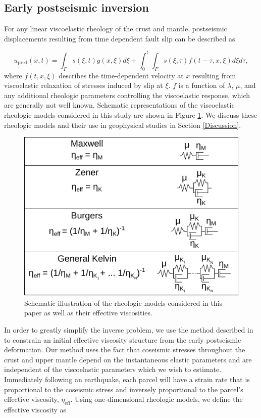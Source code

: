 \subsection{Early postseismic inversion}\label{ch3:sec:InitialInversion}
For any linear viscoelastic rheology of the crust and mantle, postseismic displacements resulting from time dependent fault slip can be described as  

\begin{equation}\label{GeneralForward}
  u_\mathrm{pred}(x,t) = \int_F s(\xi,t)g(x,\xi)d\xi + 
           \int_0^t\int_F s(\xi,\tau) f(t-\tau,x,\xi) d\xi d\tau,
\end{equation}
where $f(t,x,\xi)$ describes the time-dependent velocity at $x$ resulting from viscoelastic relaxation of stresses induced by slip at $\xi$. $f$ is a function of $\lambda$, $\mu$, and any additional rheologic parameters controlling the viscoelastic response, which are generally not well known. Schematic representations of the viscoelastic rheologic models considered in this study are shown in Figure \ref{ch3:fig:Rheology}.  We discuss these rheologic models and their use in geophysical studies in Section \ref{Discussion}. 

\begin{figure}
\includegraphics[scale=1.0]{ch3/figures/2016jb013114-f08}
\centering 
\caption{Schematic illustration of the rheologic models considered in this paper as well as their effective viscosities.}
\label{ch3:fig:Rheology}
\end{figure}

In order to greatly simplify the inverse problem, we use the method described in \citet{Hines2016} to constrain an initial effective viscosity structure from the early postseismic deformation.  Our method uses the fact that coseismic stresses throughout the crust and upper mantle depend on the instantaneous elastic parameters and are independent of the viscoelastic parameters which we wish to estimate. Immediately following an earthquake, each parcel will have a strain rate that is proportional to the coseismic stress and inversely proportional to the parcel's effective viscosity, $\eta_\mathrm{eff}$.  Using one-dimensional rheologic models, we define the effective viscosity as

